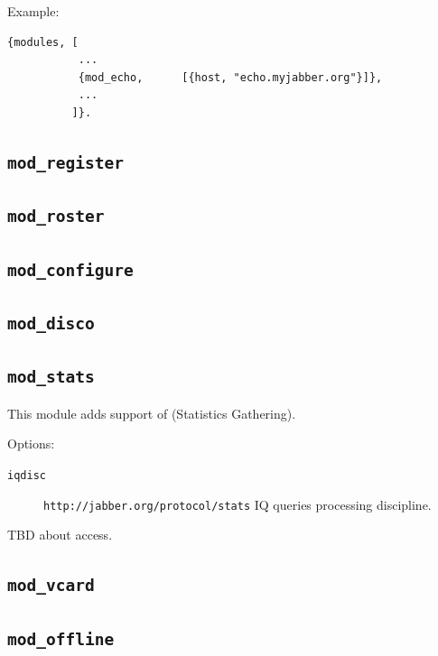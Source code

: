 \documentclass[10pt]{article}
\newcommand{\ns}[1]{\texttt{#1}}
\newcommand{\modregister}{\texttt{mod\_register}}
\newcommand{\modroster}{\texttt{mod\_roster}}
\newcommand{\modconfigure}{\texttt{mod\_configure}}
\newcommand{\moddisco}{\texttt{mod\_disco}}
\newcommand{\modstats}{\texttt{mod\_stats}}
\newcommand{\modvcard}{\texttt{mod\_vcard}}
\newcommand{\modoffline}{\texttt{mod\_offline}}
\begin{document}
Example:
\begin{verbatim}
{modules, [
           ...
           {mod_echo,      [{host, "echo.myjabber.org"}]},
           ...
          ]}.
\end{verbatim}



\subsection{\modregister{}}
\label{sec:modregister}



\subsection{\modroster{}}
\label{sec:modroster}



\subsection{\modconfigure{}}
\label{sec:modconfigure}



\subsection{\moddisco{}}
\label{sec:moddisco}



\subsection{\modstats{}}
\label{sec:modstats}

This module adds support of
 (Statistics Gathering).

Options:
\begin{description}
\item[\texttt{iqdisc}] \ns{http://jabber.org/protocol/stats} IQ queries
  processing discipline.
\end{description}

TBD about access.

\subsection{\modvcard{}}
\label{sec:modvcard}



\subsection{\modoffline{}}
\label{sec:modoffline}
\end{document}
